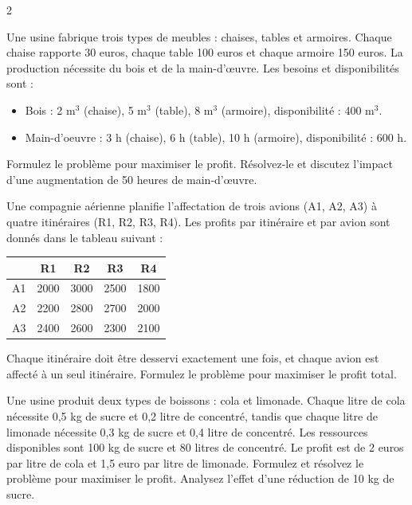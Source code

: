 \begin{multicols}{2}
\begin{exo}
	Une usine fabrique trois types de meubles : chaises, tables et armoires. Chaque chaise rapporte 30 euros, chaque table 100 euros et chaque armoire 150 euros. La production nécessite du bois et de la main-d'œuvre. Les besoins et disponibilités sont :
	\begin{itemize}
		\item Bois : 2 m$^{3}$ (chaise), 5 m$^{3}$ (table), 8 m$^{3}$ (armoire), disponibilité : 400 m$^{3}$.
		\item Main-d'oeuvre : 3 h (chaise), 6 h (table), 10 h (armoire), disponibilité : 600 h.
	\end{itemize}
	Formulez le problème pour maximiser le profit. Résolvez-le et discutez l'impact d'une augmentation de 50 heures de main-d'œuvre.
\end{exo}

\begin{exo}
	Une compagnie aérienne planifie l'affectation de trois avions (A1, A2, A3) à quatre itinéraires (R1, R2, R3, R4). Les profits par itinéraire et par avion sont donnés dans le tableau suivant :
	\begin{center}
		\begin{tabular}{c|cccc}
			& R1 & R2 & R3 & R4 \\
			\hline
			A1 & 2000 & 3000 & 2500 & 1800 \\
			A2 & 2200 & 2800 & 2700 & 2000 \\
			A3 & 2400 & 2600 & 2300 & 2100 \\
		\end{tabular}
	\end{center}
	Chaque itinéraire doit être desservi exactement une fois, et chaque avion est affecté à un seul itinéraire. Formulez le problème pour maximiser le profit total.
\end{exo}

\begin{exo}
	Une usine produit deux types de boissons : cola et limonade. Chaque litre de cola nécessite 0,5 kg de sucre et 0,2 litre de concentré, tandis que chaque litre de limonade nécessite 0,3 kg de sucre et 0,4 litre de concentré. Les ressources disponibles sont 100 kg de sucre et 80 litres de concentré. Le profit est de 2 euros par litre de cola et 1,5 euro par litre de limonade. Formulez et résolvez le problème pour maximiser le profit. Analysez l'effet d'une réduction de 10 kg de sucre.
\end{exo}


\end{multicols}
